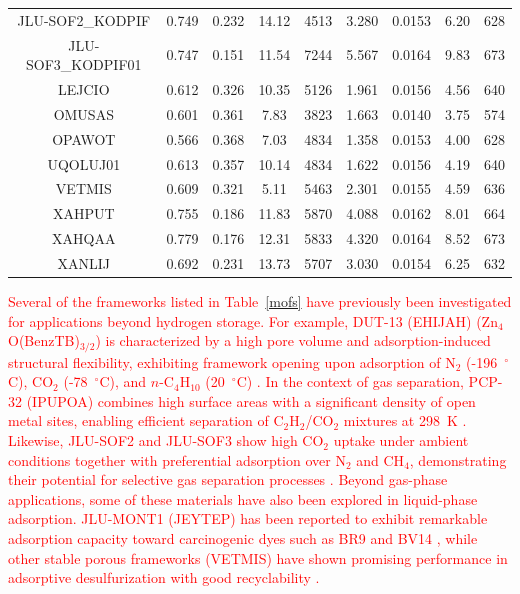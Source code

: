 \documentclass[review]{elsarticle}
\begin{document}
\begin{table}[H]
\begin{center}
\begin{tabular}{ccccccccc}
JLU-SOF2\_KODPIF  &  0.749 &  0.232  &  14.12  & 4513 & 3.280 & 0.0153 & 6.20 & 628 \\
JLU-SOF3\_KODPIF01&  0.747 &  0.151  &  11.54  & 7244 & 5.567 & 0.0164 & 9.83 & 673 \\
LEJCIO            &  0.612 &  0.326  &  10.35  & 5126 & 1.961 & 0.0156 & 4.56 & 640 \\
OMUSAS            &  0.601 &  0.361  &   7.83  & 3823 & 1.663 & 0.0140 & 3.75 & 574 \\
OPAWOT            &  0.566 &  0.368  &   7.03  & 4834 & 1.358 & 0.0153 & 4.00 & 628 \\
UQOLUJ01          &  0.613 &  0.357  &  10.14  & 4834 & 1.622 & 0.0156 & 4.19 & 640 \\
VETMIS            &  0.609 &  0.321  &   5.11  & 5463 & 2.301 & 0.0155 & 4.59 & 636 \\
XAHPUT            &  0.755 &  0.186  &  11.83  & 5870 & 4.088 & 0.0162 & 8.01 & 664 \\
XAHQAA            &  0.779 &  0.176  &  12.31  & 5833 & 4.320 & 0.0164 & 8.52 & 673 \\
XANLIJ            &  0.692 &  0.231  &  13.73  & 5707 & 3.030 & 0.0154 & 6.25 & 632 \\
\hline
\end{tabular}
\end{center}
\end{table}


\textcolor{red}{
Several of the frameworks listed in Table~\ref{mofs} have previously been 
investigated for applications beyond hydrogen storage. For example, DUT-13 
(EHIJAH) (Zn$_4$O(BenzTB)$_{3/2}$) is characterized by a high pore volume and 
adsorption-induced structural flexibility, exhibiting framework opening upon 
adsorption of N$_2$ (-196~$^\circ$C), CO$_2$ (-78~$^\circ$C), and 
$n$-C$_4$H$_{10}$ (20~$^\circ$C) \cite{gsbk+11}.}
\textcolor{red}{
In the context of gas separation, PCP-32 (IPUPOA) combines high surface areas 
with a significant density of open metal sites, enabling efficient separation 
of C$_2$H$_2$/CO$_2$ mixtures at 298~K \cite{dhzn+17}. Likewise, JLU-SOF2 and 
JLU-SOF3 show high CO$_2$ uptake under ambient conditions together with 
preferential adsorption over N$_2$ and CH$_4$, demonstrating their potential 
for selective gas separation processes \cite{zkel+19}.}
\textcolor{red}{
Beyond gas-phase applications, some of these materials have also been explored 
in liquid-phase adsorption. JLU-MONT1 (JEYTEP) has been reported to exhibit 
remarkable adsorption capacity toward carcinogenic dyes such as BR9 and BV14 
\cite{zyml+18}, while other stable porous frameworks (VETMIS) have shown 
promising performance in adsorptive desulfurization with good recyclability 
\cite{llsx12}.
}
\end{document}

